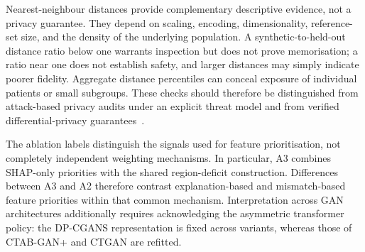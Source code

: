 Nearest-neighbour distances provide complementary descriptive evidence,
not a privacy guarantee. They depend on scaling, encoding, dimensionality,
reference-set size, and the density of the underlying population. A
synthetic-to-held-out distance ratio below one warrants inspection but does
not prove memorisation; a ratio near one does not establish safety, and
larger distances may simply indicate poorer fidelity. Aggregate distance
percentiles can conceal exposure of individual patients or small subgroups.
These checks should therefore be distinguished from attack-based privacy
audits under an explicit threat model and from verified differential-privacy
guarantees~\cite{Stadler2022SyntheticData}.

%
%
%
The ablation labels distinguish the signals used for feature prioritisation,
not completely independent weighting mechanisms. In particular, A3 combines
SHAP-only priorities with the shared region-deficit construction. Differences
between A3 and A2 therefore contrast explanation-based and mismatch-based
feature priorities within that common mechanism. Interpretation across GAN
architectures additionally requires acknowledging the asymmetric transformer
policy: the DP-CGANS representation is fixed across variants, whereas those
of CTAB-GAN+ and CTGAN are refitted.

